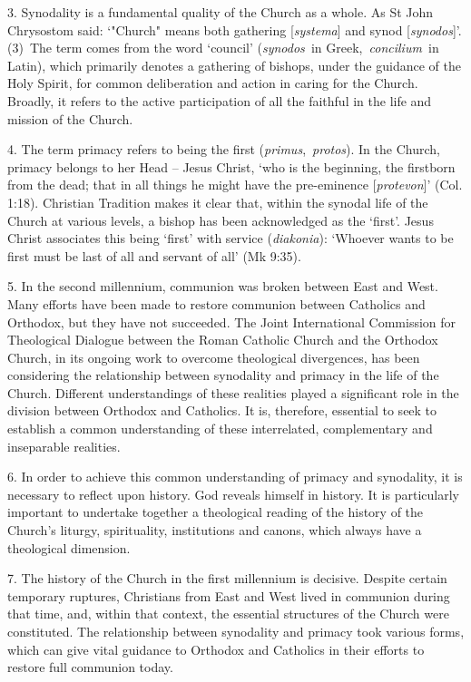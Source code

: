 3. Synodality is a fundamental quality of the Church as a whole. As St
John Chrysostom said: `"Church" means both gathering
{[}\emph{systema}{]} and synod {[}\emph{synodos}{]}'.(3)~The term comes
from the word `council' (\emph{synodos~}in Greek,~\emph{concilium~}in
Latin), which primarily denotes a gathering of bishops, under the
guidance of the Holy Spirit, for common deliberation and action in
caring for the Church. Broadly, it refers to the active participation of
all the faithful in the life and mission of the Church.

4. The term primacy refers to being the first
(\emph{primus},~\emph{protos}). In the Church, primacy belongs to her
Head -- Jesus Christ, `who is the beginning, the firstborn from the
dead; that in all things he might have the pre-eminence
{[}\emph{protevon}{]}' (Col. 1:18). Christian Tradition makes it clear
that, within the synodal life of the Church at various levels, a bishop
has been acknowledged as the `first'. Jesus Christ associates this being
`first' with service (\emph{diakonia}): `Whoever wants to be first must
be last of all and servant of all' (Mk 9:35).

5. In the second millennium, communion was broken between East and West.
Many efforts have been made to restore communion between Catholics and
Orthodox, but they have not succeeded. The Joint International
Commission for Theological Dialogue between the Roman Catholic Church
and the Orthodox Church, in its ongoing work to overcome theological
divergences, has been considering the relationship between synodality
and primacy in the life of the Church. Different understandings of these
realities played a significant role in the division between Orthodox and
Catholics. It is, therefore, essential to seek to establish a common
understanding of these interrelated, complementary and inseparable
realities.

6. In order to achieve this common understanding of primacy and
synodality, it is necessary to reflect upon history. God reveals himself
in history. It is particularly important to undertake together a
theological reading of the history of the Church's liturgy,
spirituality, institutions and canons, which always have a theological
dimension.

7. The history of the Church in the first millennium is decisive.
Despite certain temporary ruptures, Christians from East and West lived
in communion during that time, and, within that context, the essential
structures of the Church were constituted. The relationship between
synodality and primacy took various forms, which can give vital guidance
to Orthodox and Catholics in their efforts to restore full communion
today.


